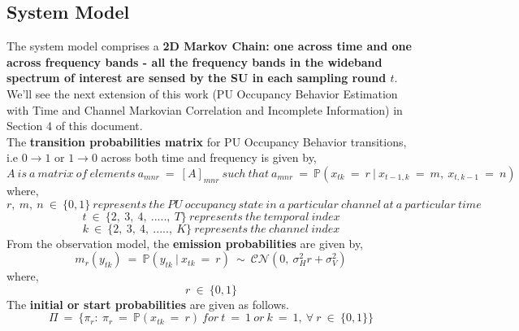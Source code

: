 \documentclass[12pt, draftcls, onecolumn]{IEEEtran}
\begin{document}
\subsection{System Model}
The system model comprises a \textbf{2D Markov Chain: one across time and one across frequency bands - all the frequency bands in the wideband spectrum of interest are sensed by the SU in each sampling round $t$}. We'll see the next extension of this work (PU Occupancy Behavior Estimation with Time and Channel Markovian Correlation and Incomplete Information) in Section 4 of this document.
\\The \textbf{transition probabilities matrix} for PU Occupancy Behavior transitions, i.e $0\longrightarrow1$ or $1\longrightarrow0$ across both time and frequency is given by,
\[A\ is\ a\ matrix\ of\ elements\ a_{mnr}\ =\ [A]_{mnr}\ such\ that\ a_{mnr}\ =\ \mathbb P(x_{tk}\ =\ r\ |\ x_{t-1,k}\ =\ m,\ x_{t,k-1}\ =\ n)\]
where,
\[r,\ m,\ n\ \in\ \{0,1\}\ represents\ the\ PU\ occupancy\ state\ in\ a\ particular\ channel\ at\ a\ particular\ time\]
\[t\ \in\ \{2,\ 3,\ 4,\ .....,\ T\}\ represents\ the\ temporal\ index\]
\[k\ \in\ \{2,\ 3,\ 4,\ .....,\ K\}\ represents\ the\ channel\ index\]
From the observation model, the \textbf{emission probabilities} are given by,
\[m_r(y_{tk})\ =\ \mathbb P(y_{tk}\ |\ x_{tk}\ =\ r)\ \sim\ \mathcal{CN}(0,\ \sigma_H^2r+\sigma_V^2)\]
where,
\[r\ \in\ \{0,1\}\]
The \textbf{initial or start probabilities} are given as follows.
\[\Pi\ =\ \{\pi_r:\ \pi_r\ =\ \mathbb P(x_{tk}\ =\ r)\ for\ t\ =\ 1\ or\ k\ =\ 1,\ \forall\ r\ \in\ \{0,1\}\}\]
\end{document}
